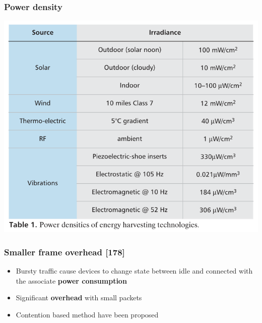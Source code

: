 \documentclass[a4paper,11pt,handout]{beamer}
\begin{document}
\begin{frame}
\frametitle{Power density}
	\begin{center}
	\includegraphics[width=.8\textwidth]{power-density.png}
	\end{center}

\end{frame}
\begin{frame}
	\frametitle{Smaller frame overhead [178]}

	\begin{itemize}
		\item Bursty traffic cause devices to change state between idle and 
		connected with the associate \textbf{power consumption}
		\item Significant \textbf{overhead} with small packets
		\item Contention based method have been proposed
		\end{itemize}
\end{frame}
\end{document}
